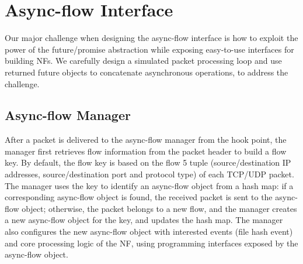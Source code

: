 \section{Async-flow Interface}
\label{sec:netstar-framework}


Our major challenge when designing the async-flow interface is how to exploit the power of the future/promise abstraction while exposing easy-to-use interfaces for building NFs. We carefully design a simulated packet processing loop and use returned future objects to concatenate asynchronous operations, to address the challenge.

\subsection{Async-flow Manager}
\label{sec:async-flow-manager}


After a packet is delivered to the async-flow manager from the hook point, the manager first retrieves flow information from the packet header to build a flow key. By default, the flow key is based on the flow 5 tuple (source/destination IP addresses, source/destination port and protocol type) of each TCP/UDP
packet. The manager uses the key to identify an async-flow object from a hash map: if a corresponding async-flow object is found, the received packet is sent to the async-flow object; otherwise, the packet belongs to a new flow, and the manager creates a new async-flow object for the key, and updates the hash map. %
The manager also configures the new async-flow object %
 with interested events (file hash event)
and core processing logic of the NF, using programming interfaces exposed by the async-flow object.




